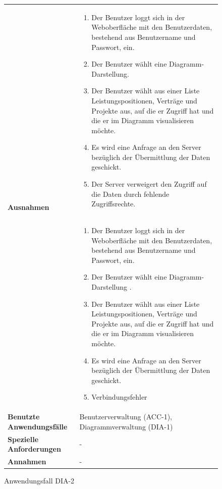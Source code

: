 \begin{figure}[h]
	\centering
	\begin{tabularx}{\textwidth}{ X | X }
		\multirow{2}{*}{\textbf{Ausnahmen}} &
		\begin{enumerate} %
			\item Der Benutzer loggt sich in der Weboberfläche mit den Benutzerdaten, bestehend aus Benutzername und Passwort, ein.
			\item Der Benutzer wählt eine Diagramm-Darstellung.
			\item Der Benutzer wählt aus einer Liste Leistungspositionen, Verträge und Projekte aus, auf die er Zugriff hat und die er im Diagramm visualisieren möchte.
			\item Es wird eine Anfrage an den Server bezüglich der Übermittlung der Daten geschickt.
			\item Der Server verweigert den Zugriff auf die Daten durch fehlende Zugriffsrechte.
		\end{enumerate} \\\cline{2-2} &
		\begin{enumerate} %
			\item Der Benutzer loggt sich in der Weboberfläche mit den Benutzerdaten, bestehend aus Benutzername und Passwort, ein.
			\item Der Benutzer wählt eine Diagramm-Darstellung .
			\item Der Benutzer wählt aus einer Liste Leistungspositionen, Verträge und Projekte aus, auf die er Zugriff hat und die er im Diagramm visualisieren möchte.
			\item Es wird eine Anfrage an den Server bezüglich der Übermittlung der Daten geschickt.
			\item Verbindungsfehler
		\end{enumerate}  \\ \hline
		\textbf{Benutzte Anwendungsfälle} & Benutzerverwaltung (ACC-1), Diagrammverwaltung (DIA-1)\\ \hline
		\textbf{Spezielle Anforderungen} & - \\ \hline
		\textbf{Annahmen} & -
	\end{tabularx}
	\caption{Anwendungsfall DIA-2}
	\label{fig:anwendungsfall-DIA-2}
\end{figure}